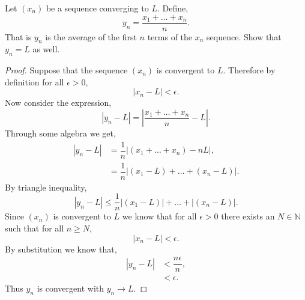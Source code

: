 \documentclass[12pt]{article}
\makeatletter
\theoremstyle{homework}
\newenvironment{exercise}[1]
{\def\@currentlabel{#1}\exercisecore}
{\endexercisecore}
\newcommand{\Nats}{\ensuremath{\mathbb N}}
\makeatother
\begin{document}
\begin{exercise}{6} Let $(x_n)$ be a sequence converging to $L$. Define,
  \begin{equation*}
    y_n = \dfrac{x_1+\dots+x_n}{n}.
  \end{equation*}
  That is $y_n$ is the average of the first $n$ terms of the $x_n$ sequence. Show that $y_n = L$ as well. \\

\begin{proof}
  Suppose that the sequence $(x_n)$ is convergent to $L$. Therefore by definition for all $\epsilon > 0$,
  \begin{equation*}
    |x_n - L|< \epsilon.
  \end{equation*} 
  Now consider the expression,
  \begin{equation*}
    |y_n - L| = |\dfrac{x_1+\dots+x_n}{n} - L|.
  \end{equation*}
  Through some algebra we get,
  \begin{align*}
    |y_n - L|&= \dfrac{1}{n}|(x_1+\dots+x_n) - nL|,\\
            &= \dfrac{1}{n}|(x_1 - L)+\dots+(x_n - L)|.
  \end{align*}
  By triangle inequality,
  \begin{equation*}
    |y_n - L|  \le \dfrac{1}{n}|(x_1 - L)|+\dots+|(x_n - L)|.
  \end{equation*}
  Since $(x_n)$ is convergent to $L$ we know that for all $\epsilon > 0$ there exists an $N\in \Nats$ such that for all $n \geq N$,
  \begin{equation*}
    |x_n - L|< \epsilon.
  \end{equation*} 
  By substitution we know that,
\begin{align*}
  |y_n - L| &< \dfrac{n \epsilon}{n},\\
  &< \epsilon.
\end{align*}
Thus $y_n$ is convergent with $y_n \to L$.
\end{proof}

\end{exercise}

\vspace{.5in}
\end{document}
